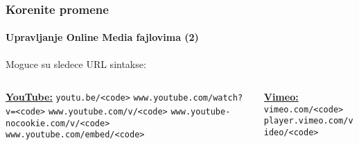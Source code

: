 \begin{frame}[fragile]
	\frametitle{Korenite promene}
	\framesubtitle{Upravljanje Online Media fajlovima (2)}

	Moguce su sledece URL sintakse:
	\vspace{0.4cm}

	\begin{columns}[T]
		\begin{column}{.52\textwidth}
			\smaller
				\tabto{0.2cm}\textbf{\underline{YouTube:}}\newline
				\tabto{0.2cm}\texttt{youtu.be/<code>}\newline
				\tabto{0.2cm}\texttt{www.youtube.com/watch?v=<code>}\newline
				\tabto{0.2cm}\texttt{www.youtube.com/v/<code>}\newline
				\tabto{0.2cm}\texttt{www.youtube-nocookie.com/v/<code>}\newline
				\tabto{0.2cm}\texttt{www.youtube.com/embed/<code>}\newline
		\end{column}
		\begin{column}{.48\textwidth}
			\vspace{-0.25cm}\smaller
				\textbf{\underline{Vimeo:}}\newline
				\texttt{vimeo.com/<code>}\newline
				\texttt{player.vimeo.com/video/<code>}\newline
		\end{column}
	\end{columns}

\end{frame}


